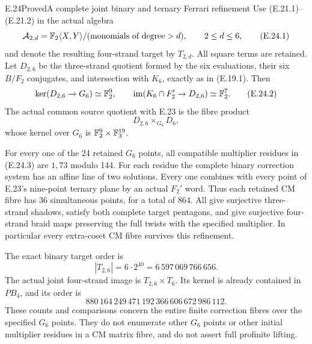 \begin{statement}{E.24}{Proved}{A complete joint binary and ternary Ferrari refinement}
Use (E.21.1)--(E.21.2) in the actual algebra
\[
 \mathcal A_{2,d}=\mathbb F_2\langle X,Y\rangle/
                 (\text{monomials of degree}>d),
 \qquad 2\leq d\leq6,
 \tag{E.24.1}
\]
and denote the resulting four-strand target by
$T_{2,d}$. All square terms are retained.
Let $D_{2,6}$ be the three-strand quotient
formed by the six evaluations, their six
$B/F_2$ conjugates, and intersection with
$K_6$, exactly as in (E.19.1). Then
\[
 \ker(D_{2,6}\to G_6)\simeq\mathbb F_2^9,
 \qquad
 \operatorname{im}(K_6\cap F_2'\to D_{2,6})\simeq\mathbb F_2^7.
 \tag{E.24.2}
\]
The actual common source quotient with
E.23 is the fibre product
\[
 D_{2,6}\mathbin{\times_{G_6}}D_6,
 \tag{E.24.3}
\]
whose kernel over $G_6$ is
$\mathbb F_2^9\times\mathbb F_3^{19}$.

For every one of the 24 retained
$G_6$ points, all compatible multiplier
residues in (E.24.3) are $1,73$ modulo
144. For each residue the complete
binary correction system has an
affine line of two solutions.
Every one combines with every
point of E.23's nine-point ternary
plane by an actual $F_2'$ word.
Thus each retained CM fibre has
36 simultaneous points, for a
total of 864. All give surjective
three-strand shadows, satisfy both
complete target pentagons, and
give surjective four-strand braid
maps preserving the full twists
with the specified multiplier.
In particular every extra-coset
CM fibre survives this refinement.

The exact binary target order is
\[
 |T_{2,6}|=6\cdot2^{40}
          =6\,597\,069\,766\,656.
 \tag{E.24.4}
\]
The actual joint four-strand image
is $T_{2,6}\times T_6$. Its
kernel is already contained in
$PB_4$, and its order is
\[
 880\,164\,249\,471\,192\,366\,606\,672\,986\,112.
 \tag{E.24.5}
\]
These counts and comparisons concern
the entire finite correction fibres
over the specified $G_6$ points.
They do not enumerate other $G_6$
points or other initial multiplier
residues in a CM matrix fibre,
and do not assert full profinite
lifting.
\end{statement}
